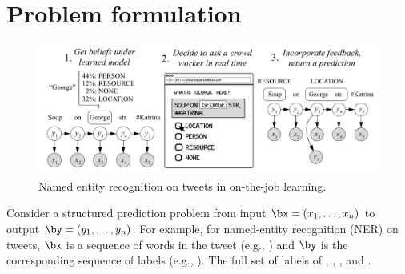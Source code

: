 \section{Problem formulation}
\label{sec:model}

\begin{figure}[t]
  \begin{centering}
  \includegraphics[width=1.0\textwidth]{figures/intro-banner.pdf}
  \end{centering}
  \caption{
    Named entity recognition on tweets in on-the-job learning.
}
\label{fig:crf}
\end{figure}


Consider a structured prediction problem from input $\bx = (x_1, \dots, x_n)$ to output $\by = (y_1, \dots, y_n)$.
For example, for named-entity recognition (NER) on tweets,
$\bx$ is a sequence of words in the tweet (e.g., )
and $\by$ is the corresponding sequence of labels (e.g., \scnone{} \scloc{} \scloc{}).
The full set of labels of \scper{}, \scloc{}, \scres{}, and \scnone{}.

